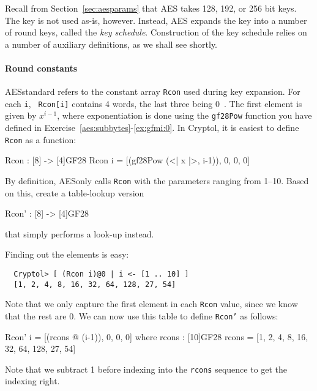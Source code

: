 Recall from Section~\ref{sec:aesparams} that AES takes 128, 192, or
256 bit keys. The key is not used as-is, however. Instead, AES\indAES
expands the key into a number of round keys, called the {\em key
  schedule}. Construction of the key schedule relies on a number of
auxiliary definitions, as we shall see shortly.

\paragraph*{Round constants} AES\indAES standard refers to the constant
array {\tt Rcon} used during key expansion. For each {\tt i}, {\tt
  Rcon[i]} contains 4 words, the last three being 0~\cite[Section
5.2]{aes}.  The first element is given by $x^{i-1}$, where
exponentiation is done using the {\tt gf28Pow} function you have
defined in Exercise~\ref{aes:subbytes}-\ref{ex:gfmi:0}. In Cryptol,
it is easiest to define {\tt Rcon} as a function:
\begin{code}
  Rcon : [8] -> [4]GF28
  Rcon i = [(gf28Pow (<| x |>, i-1)), 0, 0, 0]
\end{code}

\begin{Exercise}\label{ex:aeskerc:0}
  By definition, AES\indAES only calls {\tt Rcon} with the parameters
  ranging from 1--10.  Based on this, create a table-lookup version
\begin{code}
  Rcon' : [8] -> [4]GF28
\end{code}
that simply performs a look-up instead. 
\end{Exercise}
\begin{Answer}
Finding out the elements is easy:
\begin{Verbatim}
  Cryptol> [ (Rcon i)@0 | i <- [1 .. 10] ]
  [1, 2, 4, 8, 16, 32, 64, 128, 27, 54]
\end{Verbatim}
Note that we only capture the first element in each {\tt Rcon} value,
since we know that the rest are 0. We can now use this table to define
{\tt Rcon'} as follows:
\begin{code}
  Rcon' i = [(rcons @ (i-1)), 0, 0, 0]
      where rcons : [10]GF28
            rcons = [1, 2, 4, 8, 16, 32, 64, 128, 27, 54]
\end{code}
Note that we subtract 1 before indexing into the {\tt rcons} sequence
to get the indexing right.
\end{Answer}

